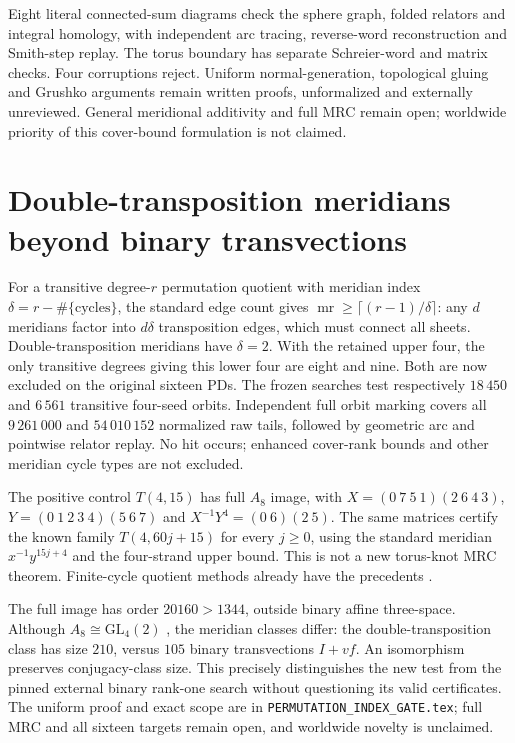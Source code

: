 \documentclass[11pt]{article}
\newcommand{\mr}{\operatorname{mr}}
\begin{document}
Eight literal connected-sum diagrams check the sphere graph,
folded relators and integral homology, with independent arc
tracing, reverse-word reconstruction and Smith-step replay.
The torus boundary has separate Schreier-word and matrix
checks. Four corruptions reject. Uniform normal-generation,
topological gluing and Grushko arguments remain written proofs,
unformalized and externally unreviewed. General meridional
additivity and full MRC remain open; worldwide priority of
this cover-bound formulation is not claimed.

\section{Double-transposition meridians beyond binary transvections}

For a transitive degree-$r$ permutation quotient with meridian
index $\delta=r-\#\{\text{cycles}\}$, the standard edge count gives
$\mr\ge\lceil(r-1)/\delta\rceil$: any $d$ meridians factor into
$d\delta$ transposition edges, which must connect all sheets.
Double-transposition meridians have $\delta=2$. With the retained
upper four, the only transitive degrees giving this lower four
are eight and nine. Both are now excluded on the original
sixteen PDs. The frozen searches test respectively $18\,450$
and $6\,561$ transitive four-seed orbits. Independent full
orbit marking covers all $9\,261\,000$ and $54\,010\,152$
normalized raw tails, followed by geometric arc and pointwise
relator replay. No hit occurs; enhanced cover-rank bounds and
other meridian cycle types are not excluded.

The positive control $T(4,15)$ has full $A_8$ image, with
$X=(0\ 7\ 5\ 1)(2\ 6\ 4\ 3)$,
$Y=(0\ 1\ 2\ 3\ 4)(5\ 6\ 7)$ and
$X^{-1}Y^4=(0\ 6)(2\ 5)$. The same matrices certify the known
family $T(4,60j+15)$ for every $j\ge0$, using the standard
meridian $x^{-1}y^{15j+4}$ and the four-strand upper bound.
This is not a new torus-knot MRC theorem. Finite-cycle quotient
methods already have the precedents \cite{bk,jp}.

The full image has order $20160>1344$, outside binary affine
three-space. Although $A_8\cong\mathrm{GL}_4(2)$ \cite{atlasa8},
the meridian classes differ: the double-transposition class
has size $210$, versus $105$ binary transvections $I+vf$.
An isomorphism preserves conjugacy-class size. This precisely
distinguishes the new test from the pinned external binary
rank-one search without questioning its valid certificates.
The uniform proof and exact scope are in
\texttt{PERMUTATION\_INDEX\_GATE.tex}; full MRC and all sixteen
targets remain open, and worldwide novelty is unclaimed.
\end{document}
